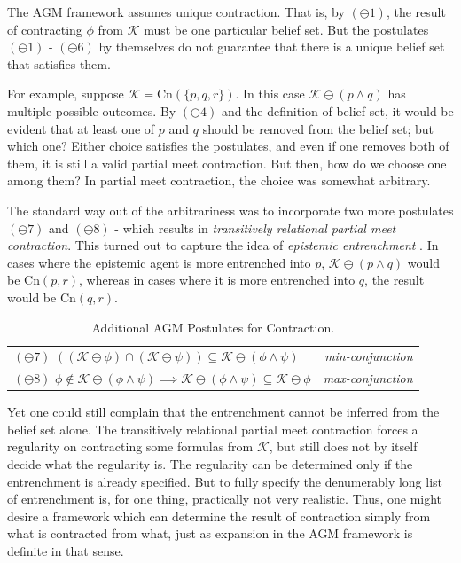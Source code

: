 \documentclass[12pt]{article}
\newcommand{\K}{\mathcal{K}}
\begin{document}
The AGM framework assumes unique contraction. That is, by $(\ominus 1)$, the result of contracting $\phi$ from $\K$ must be one particular belief set. But the postulates $(\ominus 1) \text{ - } (\ominus 6)$ by themselves do not guarantee that there is a unique belief set that satisfies them. 
\par
For example, suppose $\K = \text{Cn}(\{p, q, r\})$. In this case $\K \ominus (p \land q)$ has multiple possible outcomes. By $(\ominus 4)$ and the definition of belief set, it would be evident that at least one of $p$ and $q$ should be removed from the belief set; but which one? Either choice satisfies the postulates, and even if one removes both of them, it is still a valid partial meet contraction. But then, how do we choose one among them? In partial meet contraction, the choice was somewhat arbitrary. 
\par
The standard way out of the arbitrariness was to incorporate two more postulates $(\ominus 7)$ and $(\ominus 8)$ - which results in \textit{transitively relational partial meet contraction}. This turned out to capture the idea of \textit{epistemic entrenchment} \cite{gardenfors1988revisions}. In cases where the epistemic agent is more entrenched into $p$, $\K \ominus (p \land q)$ would be Cn$({p, r})$, whereas in cases where it is more entrenched into $q$, the result would be Cn$({q, r})$. 
\begin{table}[htpb]
\centering
\begin{tabular}{lr}
\hline
$(\ominus 7)$ $((\K \ominus \phi) \cap (\K \ominus \psi)) \subseteq \K \ominus (\phi \land \psi)$ & \textit{min-conjunction} \\
$(\ominus 8)$ $\phi \notin \K \ominus (\phi \land \psi) \implies \K \ominus (\phi \land \psi) \subseteq \K \ominus \phi$ & \textit{max-conjunction} \\
\hline
\end{tabular}
\caption{Additional AGM Postulates for Contraction.}
\label{tab:entrenchment}
\end{table}
\par
Yet one could still complain that the entrenchment cannot be inferred from the belief set alone. The transitively relational partial meet contraction forces a regularity on contracting some formulas from $\K$, but still does not by itself decide what the regularity is. The regularity can be determined only if the entrenchment is already specified. But to fully specify the denumerably long list of entrenchment is, for one thing, practically not very realistic. Thus, one might desire a framework which can determine the result of contraction simply from what is contracted from what, just as expansion in the AGM framework is definite in that sense. 
\end{document}
